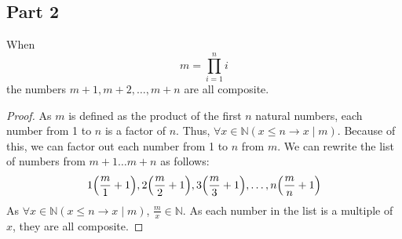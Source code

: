 \documentclass[article, 12pt]{article}
\theoremstyle{definition}
\DeclarePairedDelimiter\paren{(}{)} %
\newcommand{\nats}{\mathbb{N}}
\begin{document}
    \subsection*{Part 2}
    When  
    \[ m = \prod_{i=1}^{n} i \]
    the numbers $m+1,m+2,\dots,m+n$ are all composite.

    \begin{proof}
        As $m$ is defined as the product of the first $n$ natural numbers, each number from 1 to $n$ is a factor of $n$. Thus, $\forall x \in \nats (x \leq n \to x \mid m)$. Because of this, we can factor out each number from 1 to $n$ from $m$. We can rewrite the list of numbers from $m+1 \dots m+n$ as follows:
        \[ 1\paren*{\frac{m}{1}+1}, 2\paren*{\frac{m}{2} + 1}, 3\paren*{\frac{m}{3} + 1}, \dots, n\paren*{\frac{m}{n} + 1} \]
        As $\forall x \in \nats (x \leq n \to x \mid m)$, $\displaystyle\frac{m}{x} \in \nats$. As each number in the list is a multiple of $x$, they are all composite.
    \end{proof}
    \pagebreak
\end{document}
